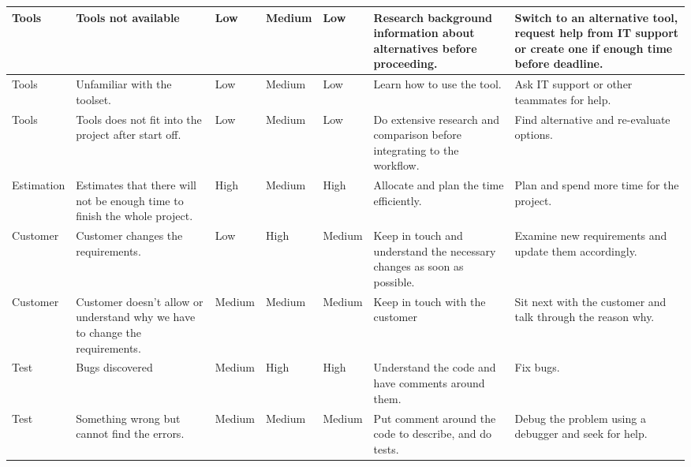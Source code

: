 \begin{longtable}{|l|p{5cm}|l|l|l|p{4cm}|p{5cm}|}
	Tools & Tools not available & Low & Medium & Low & Research background information about alternatives before proceeding. & Switch to an alternative tool, request help from IT support or create one if enough time before deadline. \\ \hline
	Tools & Unfamiliar with the toolset. & Low & Medium & Low & Learn how to use the tool. & Ask IT support or other teammates for help. \\ \hline
	Tools & Tools does not fit into the project after start off. & Low & Medium & Low & Do extensive research and comparison before integrating to the workflow. & Find alternative and re-evaluate options. \\ \hline
	
	Estimation & Estimates that there will not be enough time to finish the whole project. & High & Medium & High & Allocate and plan the time efficiently. & Plan and spend more time for the project. \\ \hline
	
	Customer & Customer changes the requirements. & Low & High & Medium & Keep in touch and understand the necessary changes as soon as possible. & Examine new requirements and update them accordingly. \\ \hline
	Customer & Customer doesn't allow or understand why we have to change the requirements. & Medium & Medium & Medium & Keep in touch with the customer & Sit next with the customer and talk through the reason why. \\ \hline
	
	Test & Bugs discovered & Medium & High & High & Understand the code and have comments around them. & Fix bugs. \\ \hline
	Test & Something wrong but cannot find the errors. & Medium & Medium & Medium & Put comment around the code to describe, and do tests. & Debug the problem using a debugger and seek for help. \\ \hline
	
\end{longtable}
